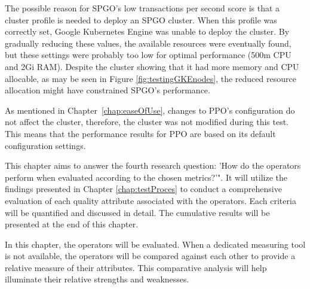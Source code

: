 The possible reason for SPGO's low transactions per second score is that a cluster profile is needed to deploy an SPGO cluster. When this profile was correctly set, Google Kubernetes Engine was unable to deploy the cluster. By gradually reducing these values, the available resources were eventually found, but these settings were probably too low for optimal performance (500m CPU and 2Gi RAM). Despite the cluster showing that it had more memory and CPU allocable, as may be seen in Figure \ref{fig:testingGKEnodes}, the reduced resource allocation might have constrained SPGO's performance.

As mentioned in Chapter~\ref{chap:easeOfUse}, changes to PPO's configuration do not affect the cluster, therefore, the cluster was not modified during this test. This means that the performance results for PPO are based on its default configuration settings.





This chapter aims to answer the fourth research question: ’How do the operators perform when evaluated according to the chosen metrics?’".
It will utilize the findings presented in Chapter \ref{chap:testProces} to conduct a comprehensive evaluation of each quality attribute associated with the operators.
Each criteria will be quantified and discussed in detail.
The cumulative results will be presented at the end of this chapter.

In this chapter, the operators will be evaluated. When a dedicated measuring tool is not available, the operators will be compared against each other to provide a relative measure of their attributes.
This comparative analysis will help illuminate their relative strengths and weaknesses.

